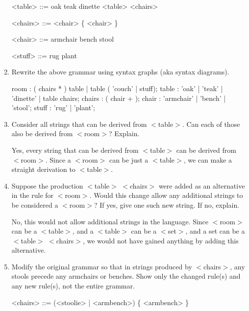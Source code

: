 \documentclass[12pt,letterpaper]{article}
\begin{document}
\begin{enumerate}
\begin{grammar}
        <table> ::= oak
                \alt teak
                \alt dinette
                \alt <table> <chairs>

        <chairs> ::= <chair> \{ <chair> \}

        <chair> ::= armchair
                \alt bench
                \alt stool

        <stuff> ::= rug
                \alt plant
      \end{grammar}

    \item Rewrite the above grammar using syntax graphs (aka syntax diagrams).
      \begin{rail}
        room : ( chairs * ) table | table ( 'couch' | stuff);
        table : 'oak' | 'teak' | 'dinette' | table chairs;
        chairs : ( chair + );
        chair : 'armchair' | 'bench' | 'stool';
        stuff : 'rug' | 'plant';
      \end{rail}

    \item
      Consider all strings that can be derived from $<$table$>$.
      Can each of those also be derived from $<$room$>$?
      Explain.

      Yes, every string that can be derived from $<$table$>$
      can be derived from $<$room$>$.
      Since a $<$room$>$ can be just a $<$table$>$,
      we can make a straight derivation to $<$table$>$.

    \item
      Suppose the production $<$table$>$ $<$chairs$>$ were added as an alternative in the rule for $<$room$>$.
      Would this change allow any additional strings to be considered a $<$room$>$?
      If yes, give one such new string.
      If no, explain.

      No, this would not allow additional strings in the language.
      Since $<$room$>$ can be a $<$table$>$, and a $<$table$>$ can be a $<$set$>$, and a set can be a $<$table$>$ $<$chairs$>$,
      we would not have gained anything by adding this alternative.

    \item
      Modify the original grammar so that in strings produced by $<$chairs$>$,
      any stools precede any armchairs or benches.
      Show only the changed rule(s) and any new rule(s),
      not the entire grammar.

      \begin{grammar}
        <chairs> ::=  (<stoolie> | <armbench>) \{ <armbench> \}


\end{grammar}
\end{enumerate}
\end{document}
